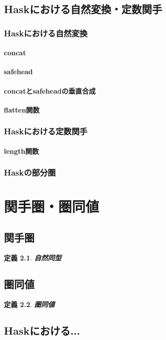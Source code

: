 \documentclass{jsbook}
\theoremstyle{plain}
\newtheorem{Def}{定義}[chapter]
\begin{document}
\section{Haskにおける自然変換・定数関手}
\subsection{Haskにおける自然変換}
\subsubsection{concat}
\subsubsection{safehead}
\subsubsection{concatとsafeheadの垂直合成}
\subsubsection{flatten関数}
\subsection{Haskにおける定数関手}
\subsubsection{length関数}
\subsection{Haskの部分圏}
\chapter{関手圏・圏同値}
\section{関手圏}
\begin{Def}
\bf{自然同型}
\end{Def}
\section{圏同値}
\begin{Def}
\bf{圏同値}
\end{Def}
\section{Haskにおける...}
\end{document}
